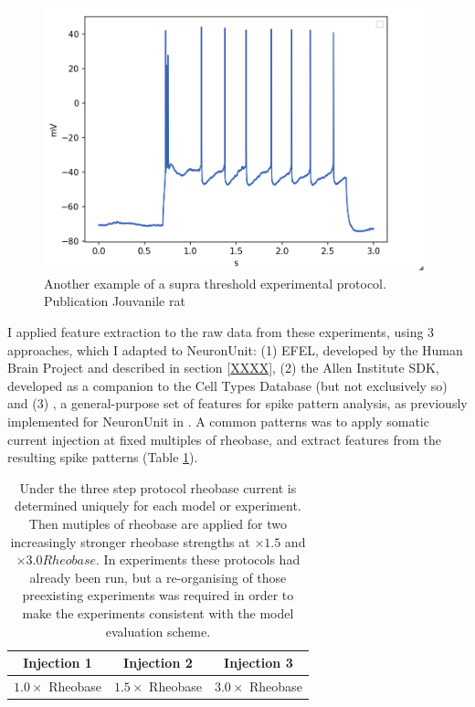 \begin{figure}  
    \begin{center}
    \includegraphics[width=0.6\linewidth]{figures/multi_spiking_large_bbp}
    \caption[Example from BBP]{Another example of a supra threshold experimental protocol. Publication Jouvanile rat \citep{toledo}}
    \label{fig:bbp_trace_adaption_late_spike}
    \end{center}
\end{figure}    

I applied feature extraction to the raw data from these experiments, using 3 approaches, which I adapted to NeuronUnit: (1) EFEL, developed by the Human Brain Project and described in section \ref{XXXX}, (2) the Allen Institute SDK, developed as a companion to the Cell Types Database (but not exclusively so) and (3) \cite{druckman-2013}, a general-purpose set of features for spike pattern analysis, as previously implemented for NeuronUnit in \cite{birgiolas2019towards}.
A common patterns was to apply somatic current injection at fixed multiples of rheobase, and extract features from the resulting spike patterns (Table \ref{table:three-step-stim}).

\begin{table}
\begin{tabular}{ccc}
\toprule
{} Injection 1 & Injection 2 & Injection 3 \\
 \midrule
 $1.0 \times$ Rheobase & $1.5 \times$ Rheobase & $3.0 \times$ Rheobase \\
\bottomrule
\end{tabular}
\caption[Model Specific, Three Step Stimulus Protocol]{Under the three step protocol rheobase current is determined uniquely for each model or experiment. Then mutiples of rheobase are applied for two increasingly stronger rheobase strengths at $\times 1.5$ and $\times 3.0 Rheobase$.
In experiments these protocols had already been run, but a re-organising of those preexisting experiments was required in order to make the experiments consistent with the model evaluation scheme.}
\label{table:three-step-stim}
\end{table}

